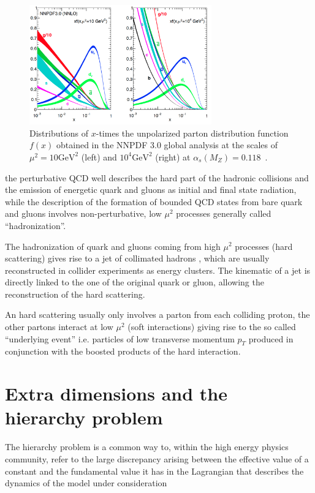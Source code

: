 \begin{figure}
  \centering
  \includegraphics[width = 0.7\textwidth]{figures/introduction/pdfs.png}
  \caption{
    Distributions of $x$-times the unpolarized parton distribution function $f(x)$
    obtained in the NNPDF 3.0 global analysis at the scales of $\mu^2 = 10 \mathrm{GeV}^2$ (left) and
    $10^4 \mathrm{GeV}^2$ (right) at $\alpha_s(M_Z) = 0.118$~\cite{pdfs}.}
  \label{fig:pdfs}
\end{figure}

the perturbative QCD well describes the hard part of the hadronic collisions and the emission of
energetic quark and gluons as initial and final state radiation,
while the description of the formation of bounded QCD states from bare quark and gluons involves non-perturbative, low $\mu^2$
processes generally called ``hadronization''. 

The hadronization of quark and gluons coming from high $\mu^2$ processes (hard scattering) gives rise
to a jet of collimated hadrons , which are usually reconstructed in collider experiments as energy clusters.
The kinematic of a jet is directly linked to the one of the original quark or gluon, allowing the reconstruction
of the hard scattering.

An hard scattering usually only involves a parton from each colliding proton, the other partons interact at low $\mu^2$
(soft interactions) giving rise to the so called ``underlying event'' i.e. particles of low transverse momentum $p_T$
produced in conjunction with the boosted products of the hard interaction.

\section{Extra dimensions and the hierarchy problem}
The hierarchy problem is a common way to, within the high energy physics community, refer to the large
discrepancy arising between the effective value of a constant and the fundamental value it has
in the Lagrangian that describes the dynamics of the model under consideration

